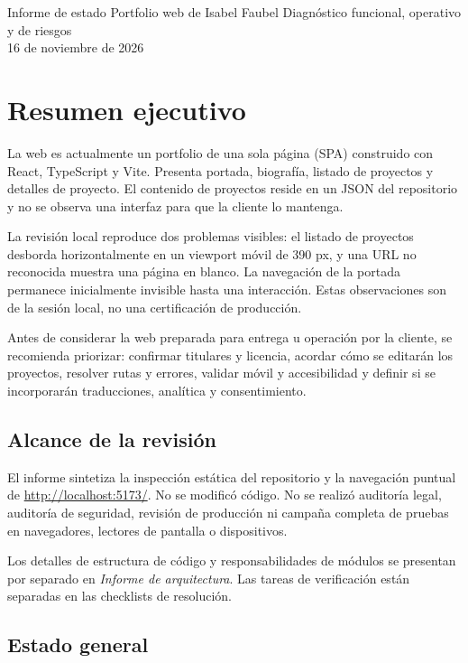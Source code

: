 \documentclass[11pt,a4paper]{report}
\begin{document}
\entregableportada
  {Informe de estado}
  {Portfolio web de Isabel Faubel}
  {Diagnóstico funcional, operativo y de riesgos\\16 de noviembre de 2026}

\tableofcontents
\clearpage

\chapter{Resumen ejecutivo}

La web es actualmente un portfolio de una sola página (SPA) construido con React, TypeScript y Vite. Presenta portada, biografía, listado de proyectos y detalles de proyecto. El contenido de proyectos reside en un JSON del repositorio y no se observa una interfaz para que la cliente lo mantenga.

La revisión local reproduce dos problemas visibles: el listado de proyectos desborda horizontalmente en un viewport móvil de 390 px, y una URL no reconocida muestra una página en blanco. La navegación de la portada permanece inicialmente invisible hasta una interacción. Estas observaciones son de la sesión local, no una certificación de producción.

Antes de considerar la web preparada para entrega u operación por la cliente, se recomienda priorizar: confirmar titulares y licencia, acordar cómo se editarán los proyectos, resolver rutas y errores, validar móvil y accesibilidad y definir si se incorporarán traducciones, analítica y consentimiento.

\section{Alcance de la revisión}

El informe sintetiza la inspección estática del repositorio y la navegación puntual de \url{http://localhost:5173/}. No se modificó código. No se realizó auditoría legal, auditoría de seguridad, revisión de producción ni campaña completa de pruebas en navegadores, lectores de pantalla o dispositivos.

Los detalles de estructura de código y responsabilidades de módulos se presentan por separado en \textit{Informe de arquitectura}. Las tareas de verificación están separadas en las checklists de resolución.

\section{Estado general}
\end{document}
